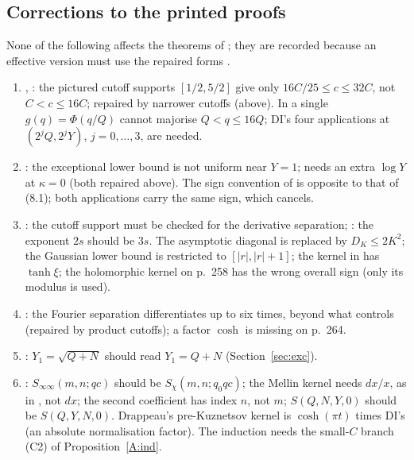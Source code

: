 \documentclass[10pt,reqno]{amsart}
\theoremstyle{definition}
\numberwithin{equation}{section}
\begin{document}
\subsection{Corrections to the printed proofs}\label{sec:eff:corr}
None of the following affects the theorems of \cite{DI,Dr}; they are
recorded because an effective version must use the repaired forms
\cite[\S\S4--6, 8]{TTL3}.
\begin{enumerate}
\item \cite[Lemma~8.1]{DI}, \cite[p.~17]{Dr}: the pictured cutoff supports
$[1/2,5/2]$ give only $16C/25\le c\le32C$, not $C<c\le16C$; repaired by narrower
cutoffs (above). In \cite[p.~17]{Dr} a single $g(q)=\Phi(q/Q)$ cannot majorise
$Q<q\le16Q$; DI's four applications at $(2^jQ,2^jY)$, $j=0,\dots,3$, are needed.
\item \cite[(8.3)]{DI}: the exceptional lower bound is not uniform near $Y=1$;
\cite[(8.2)]{DI} needs an extra $\log Y$ at $\kappa=0$ (both repaired above).
The sign convention of \cite[(1.22)]{DI} is opposite to that of (8.1); both
applications carry the same sign, which cancels.
\item \cite[p.~257]{DI}: the cutoff support must be checked for the
derivative separation; \cite[p.~259]{DI}: the exponent $2s$ should be $3s$.
The asymptotic diagonal \cite[(5.2)]{DI} is replaced by $D_K\le2K^2$; the
Gaussian lower bound \cite[pp.~260--261]{DI} is restricted to $[|r|,|r|+1]$; the
kernel in \cite[(5.6)]{DI} has $\tanh\xi$; the holomorphic kernel on p.~258 has
the wrong overall sign (only its modulus is used).
\item \cite[Theorem~13]{DI}: the Fourier separation differentiates up to six
times, beyond what \cite[(7.7)]{DI} controls (repaired by product cutoffs);
a factor $\cosh$ is missing on p.~264.
\item \cite[(8.18)]{DI}: $Y_1=\sqrt{Q+N}$ should read $Y_1=Q+N$ (Section~\ref{sec:exc}).
\item \cite[pp.~17--18]{Dr}: $S_{\infty\infty}(m,n;qc)$ should be $S_\chi(m,n;q_0qc)$; the
Mellin kernel needs $dx/x$, as in \cite[(4.10)]{Dr}, not $dx$; the second
coefficient has index $n$, not $m$; $S(Q,N,Y,0)$ should be $S(Q,Y,N,0)$.
Drappeau's pre-Kuznetsov kernel \cite[p.~14]{Dr} is $\cosh(\pi t)$ times
DI's (an absolute normalisation factor). The induction needs the small-$C$
branch (C2) of Proposition~\ref{A:ind}.
\end{enumerate}
\end{document}
